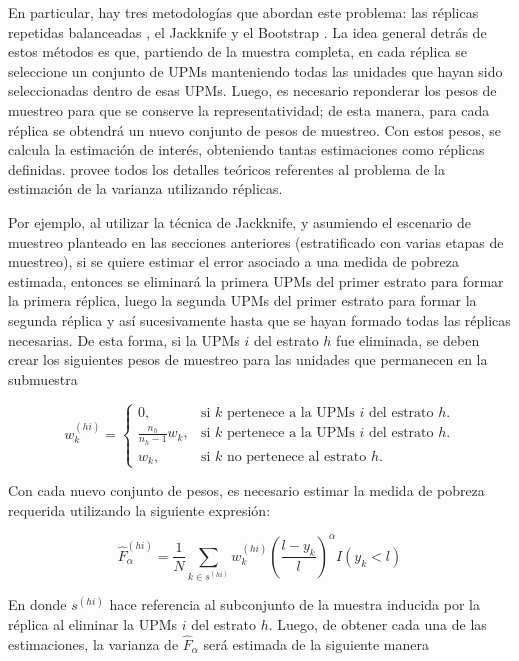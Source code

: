 \documentclass[12pt,spanish,]{book}
\begin{document}
En particular, hay tres metodologías que abordan este problema: las réplicas repetidas balanceadas \autocites{McCarthy_1969}{Judkins_1990}, el Jackknife \autocite{Krewski_Rao_1981} y el Bootstrap \autocite{Rao_Wu_1988}. La idea general detrás de estos métodos es que, partiendo de la muestra completa, en cada réplica se seleccione un conjunto de UPMs manteniendo todas las unidades que hayan sido seleccionadas dentro de esas UPMs. Luego, es necesario reponderar los pesos de muestreo para que se conserve la representatividad; de esta manera, para cada réplica se obtendrá un nuevo conjunto de pesos de muestreo. Con estos pesos, se calcula la estimación de interés, obteniendo tantas estimaciones como réplicas definidas. \textcite{Wolter_2007} provee todos los detalles teóricos referentes al problema de la estimación de la varianza utilizando réplicas.

Por ejemplo, al utilizar la técnica de Jackknife, y asumiendo el escenario de muestreo planteado en las secciones anteriores (estratificado con varias etapas de muestreo), si se quiere estimar el error asociado a una medida de pobreza estimada, entonces se eliminará la primera UPMs del primer estrato para formar la primera réplica, luego la segunda UPMs del primer estrato para formar la segunda réplica y así sucesivamente hasta que se hayan formado todas las réplicas necesarias. De esta forma, si la UPMs \(i\) del estrato \(h\) fue eliminada, se deben crear los siguientes pesos de muestreo para las unidades que permanecen en la submuestra

\[
w_{k}^{(hi)} = 
\begin{cases}
0, & \text{si $k$ pertenece a la UPMs $i$ del estrato $h$.} \\
\frac{n_h}{n_h-1}w_k, & \text{si $k$ pertenece a la UPMs $i$ del estrato $h$.} \\
w_k, & \text{si $k$ no pertenece al estrato $h$.} 
\end{cases}
\]

Con cada nuevo conjunto de pesos, es necesario estimar la medida de pobreza requerida utilizando la siguiente expresión:

\[
\hat{F}_{\alpha}^{(hi)}=\frac{1}{N}\sum_{k\in s^{(hi)}} w_k^{(hi)} 
\left(\frac{l-y_k}{l}\right)^{\alpha}I(y_k<l)
\]

En donde \(s^{(hi)}\) hace referencia al subconjunto de la muestra inducida por la réplica al eliminar la UPMs \(i\) del estrato \(h\). Luego, de obtener cada una de las estimaciones, la varianza de \(\hat{F}_{\alpha}\) será estimada de la siguiente manera
\end{document}
